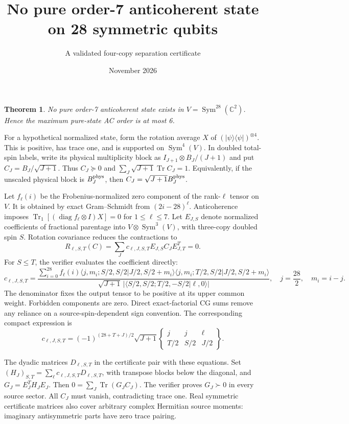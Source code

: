 \documentclass[11pt]{article}
\newtheorem{theorem}{Theorem}
\newcommand{\Tr}{\operatorname{Tr}}
\begin{document}
\title{No pure order-7 anticoherent state on 28 symmetric qubits}
\author{A validated four-copy separation certificate}\date{November 2026}\maketitle
\begin{theorem}No pure order-7 anticoherent state exists in $V=\operatorname{Sym}^{28}(\mathbb C^2)$. Hence the maximum pure-state AC order is at most 6.\end{theorem}
For a hypothetical normalized state, form the rotation average $X$ of $(|\psi\rangle\langle\psi|)^{\otimes4}$. This is positive, has trace one, and is supported on $\operatorname{Sym}^4(V)$. In doubled total-spin labels, write its physical multiplicity block as $I_{J+1}\otimes B_J/(J+1)$ and put $C_J=B_J/\sqrt{J+1}$. Thus $C_J\succeq0$ and $\sum_J\sqrt{J+1}\Tr C_J=1$. Equivalently, if the unscaled physical block is $B_J^{\rm phys}$, then $C_J=\sqrt{J+1}B_J^{\rm phys}$.

Let $f_\ell(i)$ be the Frobenius-normalized zero component of the rank-$\ell$ tensor on $V$. It is obtained by exact Gram--Schmidt from $(2i-28)^\ell$. Anticoherence imposes $\Tr_1[(\operatorname{diag}f_\ell\otimes I)X]=0$ for $1\le\ell\le 7$. Let $E_{J,S}$ denote normalized coefficients of fractional parentage into $V\otimes\operatorname{Sym}^3(V)$, with three-copy doubled spin $S$. Rotation covariance reduces the contractions to
\[
 R_{\ell,S,T}(C)=\sum_Jc_{\ell,J,S,T}E_{J,S}C_JE_{J,T}^T=0.
\]
For $S\le T$, the verifier evaluates the coefficient directly:
\[
 c_{\ell,J,S,T}=\frac{\sum_{i=0}^{28}f_\ell(i)
 \langle j,m_i;S/2,S/2|J/2,S/2+m_i\rangle
 \langle j,m_i;T/2,S/2|J/2,S/2+m_i\rangle}
 {\sqrt{J+1}\,|\langle S/2,S/2;T/2,-S/2|\ell,0\rangle|},
 \quad j=\frac{28}{2},\quad m_i=i-j.
\]
The denominator fixes the output tensor to be positive at its upper common weight. Forbidden components are zero. Direct exact-factorial CG sums remove any reliance on a source-spin-dependent sign convention. The corresponding compact expression is
\[
 c_{\ell,J,S,T}=(-1)^{(28+T+J)/2}\sqrt{J+1}
 \begin{Bmatrix}j&j&\ell\\T/2&S/2&J/2\end{Bmatrix}.
\]

The dyadic matrices $D_{\ell,S,T}$ in the certificate pair with these equations. Set $(H_J)_{S,T}=\sum_\ell c_{\ell,J,S,T}D_{\ell,S,T}$, with transpose blocks below the diagonal, and $G_J=E_J^TH_JE_J$. Then $0=\sum_J\Tr(G_JC_J)$. The verifier proves $G_J\succ0$ in every source sector. All $C_J$ must vanish, contradicting trace one. Real symmetric certificate matrices also cover arbitrary complex Hermitian source moments: imaginary antisymmetric parts have zero trace pairing.
\end{document}
